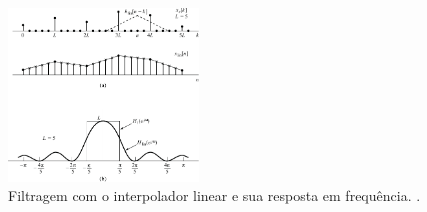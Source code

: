 \begin{frame}[allowframebreaks]
        \begin{figure}[h!]
        \centering
        \includegraphics[width=0.45\textwidth]{images/fig426.pdf}
        \caption{Filtragem com o interpolador linear e sua resposta em frequência. \citep{oppenheim2009}.}
        \label{fig:fig426}
        \end{figure}
\end{frame}



